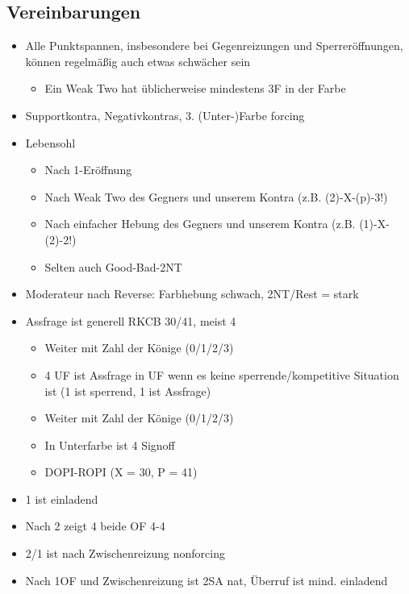 \documentclass{article}
\begin{document}
\begin{twocolumn}

\section*{Vereinbarungen}

\begin{itemize}
\item Alle Punktspannen, insbesondere bei Gegenreizungen und Sperreröffnungen,
 können regelmä\ss ig auch etwas schwächer sein
 \begin{itemize}
 \item Ein Weak Two hat üblicherweise mindestens 3F in der Farbe
 \end{itemize}
\item Supportkontra, Negativkontras, 3. (Unter-)Farbe forcing
\item Lebensohl
 \begin{itemize}
 \item Nach 1\SA-Eröffnung
 \item Nach Weak Two des Gegners und unserem Kontra (z.B. (2\coeur)-X-(p)-3\SA!)
 \item Nach einfacher Hebung des Gegners und unserem Kontra (z.B. (1\pik)-X-(2\pik)-2\SA!)
 \item Selten auch Good-Bad-2NT
 \end{itemize}
\item Moderateur nach Reverse: Farbhebung schwach, 2NT/Rest = stark
\item Assfrage ist generell RKCB 30/41, meist 4\SA
 \begin{itemize}
 \item Weiter mit Zahl der Könige (0/1/2/3)
 \item 4 UF ist Assfrage in UF wenn es keine sperrende/kompetitive Situation ist
  (1\treff{} ist sperrend, 1\treff{} ist Assfrage)
 \item Weiter mit Zahl der Könige (0/1/2/3)
 \item In Unterfarbe ist 4\SA{} Signoff
 \item DOPI-ROPI (X = 30, P = 41)
 \end{itemize}
\item 1\pik{} ist einladend
\item Nach 2\karo{} zeigt 4\treff{} beide OF 4-4
\item 2/1 ist nach Zwischenreizung nonforcing
\item Nach 1OF und Zwischenreizung ist 2SA nat, Überruf ist mind. einladend
\end{itemize}

\end{twocolumn}
\end{document}
